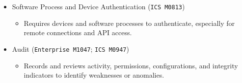 \documentclass[10pt,a4paper,oneside]{report}
\begin{document}
\begin{itemize}
\begin{itemize}
\begin{itemize}
\end{itemize}
\item Software Process and Device Authentication (\texttt{ICS M0813})
\begin{itemize}
\item Requires devices and software processes to authenticate, especially for remote connections and API access.
\end{itemize}
\item Audit (\texttt{Enterprise M1047}; \texttt{ICS M0947})
\begin{itemize}
\item Records and reviews activity, permissions, configurations, and integrity indicators to identify weaknesses or anomalies.
\end{itemize}
\end{itemize}
\end{itemize}
\end{document}

